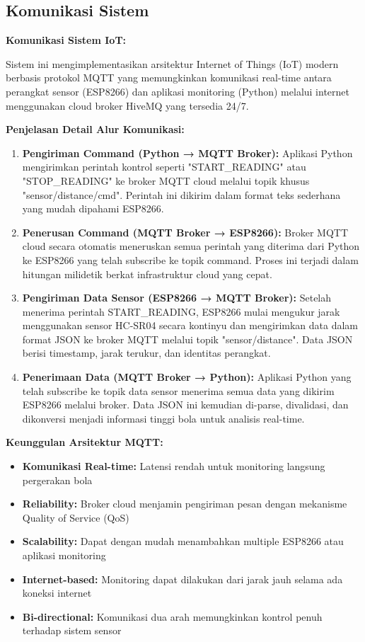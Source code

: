 \newpage

\subsection{Komunikasi Sistem}

\textbf{Komunikasi Sistem IoT:}

Sistem ini mengimplementasikan arsitektur Internet of Things (IoT) modern berbasis protokol MQTT yang memungkinkan komunikasi real-time antara perangkat sensor (ESP8266) dan aplikasi monitoring (Python) melalui internet menggunakan cloud broker HiveMQ yang tersedia 24/7.

\textbf{Penjelasan Detail Alur Komunikasi:}

\begin{enumerate}
\item \textbf{Pengiriman Command (Python → MQTT Broker):} Aplikasi Python mengirimkan perintah kontrol seperti "START\_READING" atau "STOP\_READING" ke broker MQTT cloud melalui topik khusus "sensor/distance/cmd". Perintah ini dikirim dalam format teks sederhana yang mudah dipahami ESP8266.

\item \textbf{Penerusan Command (MQTT Broker → ESP8266):} Broker MQTT cloud secara otomatis meneruskan semua perintah yang diterima dari Python ke ESP8266 yang telah subscribe ke topik command. Proses ini terjadi dalam hitungan milidetik berkat infrastruktur cloud yang cepat.

\item \textbf{Pengiriman Data Sensor (ESP8266 → MQTT Broker):} Setelah menerima perintah START\_READING, ESP8266 mulai mengukur jarak menggunakan sensor HC-SR04 secara kontinyu dan mengirimkan data dalam format JSON ke broker MQTT melalui topik "sensor/distance". Data JSON berisi timestamp, jarak terukur, dan identitas perangkat.

\item \textbf{Penerimaan Data (MQTT Broker → Python):} Aplikasi Python yang telah subscribe ke topik data sensor menerima semua data yang dikirim ESP8266 melalui broker. Data JSON ini kemudian di-parse, divalidasi, dan dikonversi menjadi informasi tinggi bola untuk analisis real-time.
\end{enumerate}

\textbf{Keunggulan Arsitektur MQTT:}
\begin{itemize}
\item \textbf{Komunikasi Real-time:} Latensi rendah untuk monitoring langsung pergerakan bola
\item \textbf{Reliability:} Broker cloud menjamin pengiriman pesan dengan mekanisme Quality of Service (QoS)
\item \textbf{Scalability:} Dapat dengan mudah menambahkan multiple ESP8266 atau aplikasi monitoring
\item \textbf{Internet-based:} Monitoring dapat dilakukan dari jarak jauh selama ada koneksi internet
\item \textbf{Bi-directional:} Komunikasi dua arah memungkinkan kontrol penuh terhadap sistem sensor
\end{itemize}

